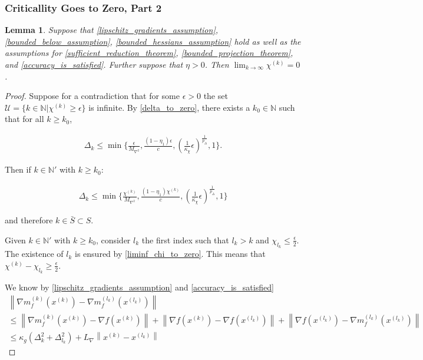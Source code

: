 \documentclass{article}
\newtheorem{lemma}[theorem]{Lemma}
\theoremstyle{case}
\numberwithin{theorem}{subsection}
\newcommand{\chik}{{\chi^{(k)}}}
\newcommand{\dk}{\Delta_k}
\newcommand{\gk}{{\nabla m_f^{(k)}\left(x^{(k)}\right)}}
\newcommand{\gradf}{\nabla f}
\newcommand{\lipgrad}{{L_{\nabla}}}
\newcommand{\maxhessian}{{M_{\nabla^2}}}
\newcommand{\naturals}{\mathbb N}
\newcommand{\xk}{{x^{(k)}}}
\begin{document}
\subsubsection{Criticallity Goes to Zero, Part 2}
\begin{lemma}
\label{lim_chi_to_zero}
Suppose that \cref{lipschitz_gradients_assumption}, \cref{bounded_below_assumption}, \cref{bounded_hessians_assumption} hold as well as the assumptions for 
\cref{sufficient_reduction_theorem}, \cref{bounded_projection_theorem}, and \cref{accuracy_is_satisfied}.
Further suppose that $\eta > 0$.
Then $\lim_{k\to\infty}\chik=0$.
\end{lemma}


\begin{proof}
Suppose for a contradiction that for some $\epsilon > 0$ the set $\mathcal U = \{k \in \naturals | \chik \ge \epsilon \}$ is infinite.
By \cref{delta_to_zero}, there exists a $k_0 \in \naturals$ such that for all $k \ge k_0$,

\begin{align*}
\dk \le \min\{\frac{\epsilon}{\maxhessian}, \frac{(1-\eta_1)\epsilon}{c}, \left(\frac 1 {\kappa_{\chi}}  \epsilon \right)^{\frac 1 {p_{\Delta}}}, 1\}.
\end{align*}

Then if $k \in \naturals '$ with $k \ge k_0$:

\begin{align*}
\dk \le \min\{\frac{\chik}{\maxhessian}, \frac{(1-\eta_1)\chik}{c}, \left(\frac 1 {\kappa_{\chi}}  \epsilon \right)^{\frac 1 {p_{\Delta}}}, 1\}
\end{align*}

and therefore $k \in \bar S \subset S$.

Given $k \in \naturals'$ with $k\ge k_0$, consider $l_k$ the first index such that $l_k > k$ and $\chi_{l_k} \le \frac{\epsilon} 2$.
The existence of $l_k$ is ensured by \cref{liminf_chi_to_zero}.
This means that $\chik - \chi_{l_k} \ge \frac {\epsilon} 2 $.

We know by \cref{lipschitz_gradients_assumption} and \cref{accuracy_is_satisfied}
\begin{align}
\left\|\gk - {\nabla m_f^{(l_k)}\left(x^{(l_k)}\right)}\right\| \nonumber \\
\le \left\|\gk - \gradf(\xk)\right\| + \left\|\gradf(\xk) - \gradf(x^{(l_k)})\right\| + \left\|\gradf(x^{(l_k)}) - {\nabla m_f^{(l_k)}\left(x^{(l_k)}\right)}\right\| \nonumber \\
\le \kappa_g \left(\dk^2 + \Delta_{l_k}^2\right) + \lipgrad \left\|\xk - x^{(l_k)} \right\| \label{chi2zero2_comp1}
\end{align}



\end{proof}
\end{document}
